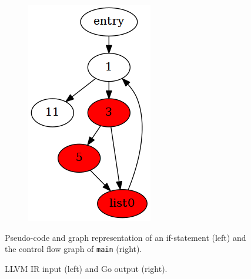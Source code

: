 \documentclass[a2paper,landscape,fontscale=0.35]{baposter}
\begin{document}
\begin{poster}
{\begin{figure}[H]
\begin{subfigure}[ht]{0.50\textwidth}
			\includegraphics[width=\textwidth]{inc/foo.png}
		\end{subfigure}
		\caption{Pseudo-code and graph representation of an if-statement (left) and the control flow graph of \texttt{main} (right).}
	\end{figure}
}

{
	\begin{figure}[H]
		\centering
		\begin{subfigure}[ht]{0.61\textwidth}
			
		\end{subfigure}
		\quad
		\begin{subfigure}[ht]{0.26\textwidth}
			
		\end{subfigure}
		\caption{LLVM IR input (left) and Go output (right).}
	\end{figure}
}


\end{poster}
\end{document}
